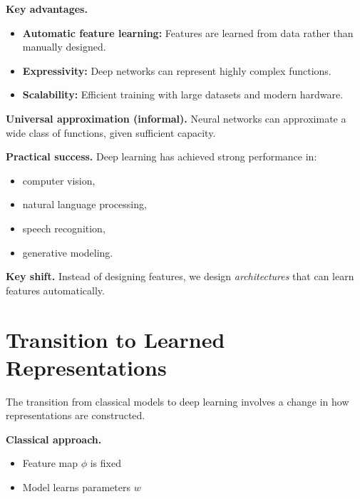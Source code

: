 \medskip

\noindent
\textbf{Key advantages.}

\begin{itemize}
    \item \textbf{Automatic feature learning:}  
    Features are learned from data rather than manually designed.

    \item \textbf{Expressivity:}  
    Deep networks can represent highly complex functions.

    \item \textbf{Scalability:}  
    Efficient training with large datasets and modern hardware.
\end{itemize}

\medskip

\noindent
\textbf{Universal approximation (informal).}  
Neural networks can approximate a wide class of functions, given sufficient capacity.

\medskip

\noindent
\textbf{Practical success.}  
Deep learning has achieved strong performance in:
\begin{itemize}
    \item computer vision,
    \item natural language processing,
    \item speech recognition,
    \item generative modeling.
\end{itemize}

\medskip

\noindent
\textbf{Key shift.}  
Instead of designing features, we design \emph{architectures} that can learn features automatically.

\section{Transition to Learned Representations}

The transition from classical models to deep learning involves a change in how representations are constructed.

\medskip

\noindent
\textbf{Classical approach.}
\begin{itemize}
    \item Feature map $\phi$ is fixed
    \item Model learns parameters $w$
\end{itemize}

